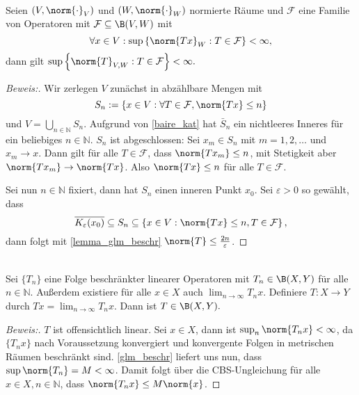 \begin{theorem} \label{glm_beschr} \\
	Seien $(V, \norm{\cdot}_V)$ und $(W, \norm{\cdot}_W)$ normierte Räume und $\mathcal{F}$ eine Familie von Operatoren mit $\mathcal{F} \subseteq \B(V, W)$ mit 
	\[
	\forall x \in V: \sup{\left\{\norm{Tx}_W: T \in \mathcal{F}\right\}} < \infty,
	\] 
	dann gilt $\sup{\left\{\norm{T}_{V, W}: T \in \mathcal{F}\right\}} < \infty.$
	
	\begin{proof}[Beweis:] 
		Wir zerlegen $V$ zunächst in abzählbare Mengen mit 
		\[
		S_n := \left\{ x \in V: \forall T \in \mathcal{F}, \norm{Tx} \leq n \right\} 
		\]
		und $V = \bigcup_{n \in \mathbb{N}} S_n$. Aufgrund von \ref{baire_kat} hat $\bar{S}_n$ ein nichtleeres Inneres für ein beliebiges $n \in \mathbb{N}$. $S_n$ ist abgeschlossen: Sei $x_m \in S_n$ mit $m = 1, 2, \ldots$ und $x_m \to x$. Dann gilt für alle $T \in \mathcal{F}$, dass $\norm{Tx_m} \leq n$, mit Stetigkeit aber $\norm{Tx_m} \to \norm{Tx}$. Also $\norm{Tx} \leq n$ für alle $T \in \mathcal{F}$.
		
		Sei nun $n \in \mathbb{N}$ fixiert, dann hat $S_n$ einen inneren Punkt $x_0$. Sei $\varepsilon > 0$ so gewählt, dass 
		\[
		\overline{K_{\varepsilon}(x_0)} \subseteq S_n \subseteq \left\{ x \in V: \norm{Tx} \leq n, T \in \mathcal{F} \right\},
		\]
		dann folgt mit \ref{lemma_glm_beschr} $\norm{T} \leq \frac{2n}{\varepsilon}$.
	\end{proof}
\end{theorem}

\begin{theorem} \\
	\label{Banach_Steinhaus}
	Sei $\{T_n\}$ eine Folge beschränkter linearer Operatoren mit $T_n \in \B(X, Y)$ für alle $n \in \mathbb{N}$. Außerdem existiere für alle $x \in X$ auch $\lim_{n \to \infty} T_n x$. Definiere $T: X \to Y$ durch $Tx = \lim_{n \to \infty} T_n x$. Dann ist $T \in \B(X, Y).$
	
	\begin{proof}[Beweis:] 
		$T$ ist offensichtlich linear. Sei $x \in X$, dann ist $\sup_{n}{\norm{T_n x}} < \infty$, da $\{T_n x\}$ nach Voraussetzung konvergiert und konvergente Folgen in metrischen Räumen beschränkt sind. \ref{glm_beschr} liefert uns nun, dass $\sup{\norm{T_n}} = M < \infty$. Damit folgt über die CBS-Ungleichung für alle $x \in X, n \in \mathbb{N}$, dass $\norm{T_n x} \leq M \norm{x}$.
	\end{proof}
\end{theorem}


